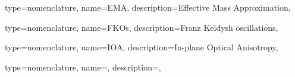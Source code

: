 {type={nomenclature},
name={EMA},
description={Effective Mass Approximation},
}

{type={nomenclature},
name={FKOs},
description={Franz Keldysh oscillations},
}

{type={nomenclature},
name={IOA},
description={In-plane Optical Anisotropy},
}




\newglossaryentry{}
{type={nomenclature},
name={},
description={},
}

\renewcommand{\glsnamefont}[1]{\textcolor{black}{\textbf{#1}}}
\printunsrtglossary[type=nomenclature,style=long3col]
\printunsrtglossary[type=abbreviations,title={List of codes and packages}]
\printunsrtglossary[type=symbols,]

